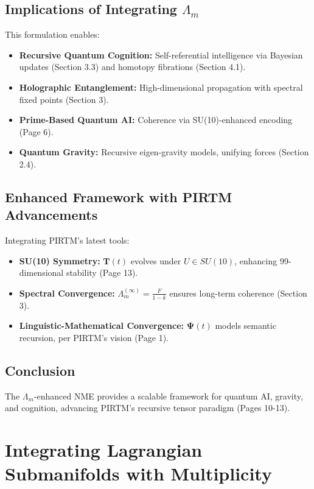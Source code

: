 \documentclass{article}
\theoremstyle{plain}
\begin{document}
\subsection{Implications of Integrating \(\Lambda_m\)}
This formulation enables:
\begin{itemize}
    \item \textbf{Recursive Quantum Cognition:} Self-referential intelligence via Bayesian updates (Section 3.3) and homotopy fibrations (Section 4.1).
    \item \textbf{Holographic Entanglement:} High-dimensional propagation with spectral fixed points (Section 3).
    \item \textbf{Prime-Based Quantum AI:} Coherence via SU(10)-enhanced encoding (Page 6).
    \item \textbf{Quantum Gravity:} Recursive eigen-gravity models, unifying forces (Section 2.4).
\end{itemize}

\subsection{Enhanced Framework with PIRTM Advancements}
Integrating PIRTM’s latest tools:
\begin{itemize}
    \item \textbf{SU(10) Symmetry:} \( \bm{T}(t) \) evolves under \( U \in SU(10) \), enhancing 99-dimensional stability (Page 13).
    \item \textbf{Spectral Convergence:} \( \Lambda_m^{(\infty)} = \frac{F}{1 - k} \) ensures long-term coherence (Section 3).
    \item \textbf{Linguistic-Mathematical Convergence:} \(\bm{\Psi}(t)\) models semantic recursion, per PIRTM’s vision (Page 1).
\end{itemize}

\subsection{Conclusion}
The \(\Lambda_m\)-enhanced NME provides a scalable framework for quantum AI, gravity, and cognition, advancing PIRTM’s recursive tensor paradigm (Pages 10-13).



\section{Integrating Lagrangian Submanifolds with Multiplicity}
\end{document}
